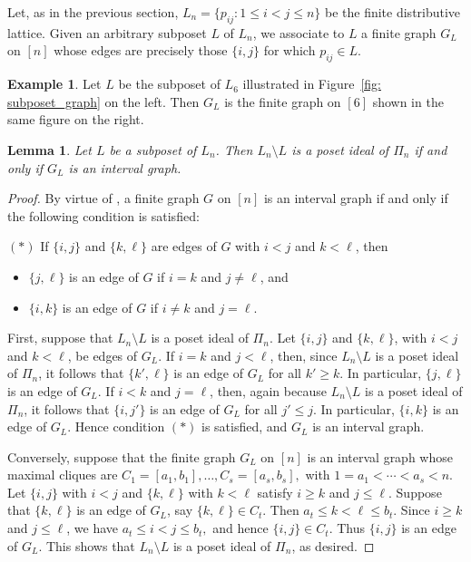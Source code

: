 \documentclass[12pt,a4paper]{amsart}
\newtheorem{Lemma}[Theorem]{Lemma}
\theoremstyle{definition}
\newtheorem{Example}[Theorem]{Example}
\begin{document}
Let, as in the previous section, \(L_n = \{p_{ij} : 1 \leq i < j \leq n\}\) be the finite distributive lattice. Given an arbitrary subposet \(L\) of \(L_n\), we associate to \(L\) a finite graph \(G_L\) on \([n]\) whose edges are precisely those \(\{i,j\}\) for which \(p_{ij} \in L\).

\begin{Example}
    Let $L$ be the subposet of $L_6$ illustrated in Figure~\ref{fig: subposet_graph} on the left.  Then $G_L$ is the finite graph on $[6]$ shown in the same figure on the right. 
\end{Example}
\begin{Lemma}
    \label{Sydney}
    Let $L$ be a subposet of $L_n$.  Then $L_n \setminus L$ is a poset ideal of $\Pi_n$ if and only if $G_L$ is an interval graph.  
\end{Lemma}

\begin{proof}
By virtue of \cite[Theorem~2.2]{EHH11}, a finite graph $G$ on $[n]$ is an interval graph if and only if the following condition is satisfied:

\medskip
\noindent$(*)$
If $\{i,j\}$ and $\{k,\ell\}$ are edges of $G$ with $i<j$ and $k<\ell$, then
\begin{itemize}
  \item $\{j,\ell\}$ is an edge of $G$ if $i=k$ and $j\neq \ell$, and
  \item $\{i,k\}$ is an edge of $G$ if $i\neq k$ and $j=\ell$.
\end{itemize}

First, suppose that $L_n \setminus L$ is a poset ideal of $\Pi_n$. 
Let $\{i,j\}$ and $\{k,\ell\}$, with $i<j$ and $k<\ell$, be edges of $G_L$.
If $i=k$ and $j<\ell$, then, since $L_n \setminus L$ is a poset ideal of $\Pi_n$, 
it follows that $\{k',\ell\}$ is an edge of $G_L$ for all $k' \geq k$.
In particular, $\{j,\ell\}$ is an edge of $G_L$.
If $i<k$ and $j=\ell$, then, again because $L_n \setminus L$ is a poset ideal of $\Pi_n$, 
it follows that $\{i,j'\}$ is an edge of $G_L$ for all $j' \leq j$.
In particular, $\{i,k\}$ is an edge of $G_L$.
Hence condition $(*)$ is satisfied, and $G_L$ is an interval graph.

Conversely, suppose that the finite graph $G_L$ on $[n]$ is an interval graph whose maximal cliques are
$
C_1=[a_1,b_1], \ldots, C_s=[a_s,b_s],
$
with $1=a_1<\cdots<a_s<n$.
Let $\{i,j\}$ with $i<j$ and $\{k,\ell\}$ with $k<\ell$ satisfy $i\geq k$ and $j\leq \ell$.
Suppose that $\{k,\ell\}$ is an edge of $G_L$, say $\{k,\ell\}\in C_t$.
Then $a_t \leq k < \ell \leq b_t$.
Since $i\geq k$ and $j\leq \ell$, we have
$
a_t \leq i < j \leq b_t,
$
and hence $\{i,j\} \in C_t$.
Thus $\{i,j\}$ is an edge of $G_L$.
This shows that $L_n \setminus L$ is a poset ideal of $\Pi_n$, as desired.
\end{proof}
\end{document}
